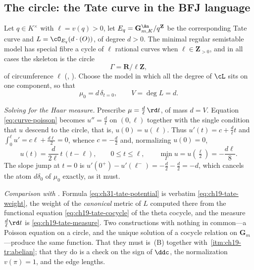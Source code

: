 \subsection{The circle: the Tate curve in the BFJ language}
\label{sec:ch31-circle}

\begin{example}
\label{ex:ch31-tate-bfj}
Let \(q\in K^\times\) with \(\ell=v(q)>0\), let
\(E_q=\mathbf G_{m,K}^{\An}/q^{\mathbf Z}\) be the corresponding Tate curve
and \(L=\cO_{E_q}(d\cdot(O))\), of degree \(d>0\).  The minimal regular
semistable model has special fibre a cycle of \(\ell\) rational curves when
\(\ell\in\mathbf Z_{>0}\), and in all cases the skeleton is the circle
\[
 \Gamma=\mathbf R/\ell\mathbf Z ,
\]
of circumference \(\ell\) (,
).  Choose the model in which all the degree of
\(\cL\) sits on one component, so that
\[
 \mu_0=d\,\delta_{t=0},\qquad V=\deg L=d .
\]

\emph{Solving for the Haar measure.}  Prescribe
\(\mu=\tfrac d\ell\,\rd t\), of mass \(d=V\).  Equation
\eqref{eq:curve-poisson} becomes \(u''=\tfrac d\ell\) on \((0,\ell)\)
together with the single condition that \(u\) descend to the circle, that
is, \(u(0)=u(\ell)\).  Thus \(u'(t)=c+\tfrac d\ell t\) and
\(\int_0^\ell u'=c\ell+\tfrac{d\ell}{2}=0\), whence \(c=-\tfrac d2\) and,
normalizing \(u(0)=0\),
\begin{equation}
\label{eq:ch31-tate-potential}
 u(t)=\frac{d}{2\ell}\,t\,(t-\ell),
 \qquad 0\leq t\leq\ell,
 \qquad \min_\Gamma u=u(\tfrac\ell2)=-\frac{d\ell}{8} .
\end{equation}
The slope jump at \(t=0\) is
\(u'(0^+)-u'(\ell^-)=-\tfrac d2-\tfrac d2=-d\), which cancels the atom
\(d\delta_0\) of \(\mu_0\) exactly, as it must.

\emph{Comparison with .}  Formula
\eqref{eq:ch31-tate-potential} is verbatim \eqref{eq:ch19-tate-weight}, the
weight of the \emph{canonical} metric of \(L\) computed there from the
functional equation \eqref{eq:ch19-tate-cocycle} of the theta cocycle, and
the measure \(\tfrac d\ell\rd t\) is \eqref{eq:ch19-tate-measure}.  Two
constructions with nothing in common---a Poisson equation on a circle, and
the unique solution of a cocycle relation on \(\mathbf G_m\)---produce the
same function.  That they must is
\,(B) together with
\,\cref{itm:ch19-tr:abelian}; that they do is a
check on the sign of \(\ddc\), the normalization \(v(\pi)=1\), and the edge
lengths.


\end{example}
